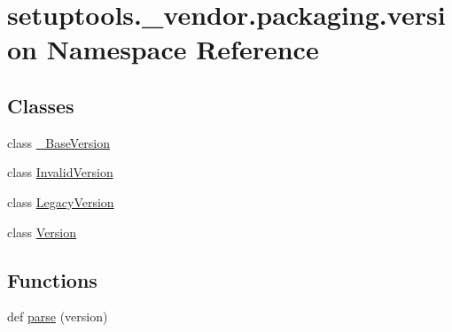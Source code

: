 \hypertarget{namespacesetuptools_1_1__vendor_1_1packaging_1_1version}{}\section{setuptools.\+\_\+vendor.\+packaging.\+version Namespace Reference}
\label{namespacesetuptools_1_1__vendor_1_1packaging_1_1version}
\subsection*{Classes}
\begin{DoxyCompactItemize}
\item 
class \hyperlink{classsetuptools_1_1__vendor_1_1packaging_1_1version_1_1__BaseVersion}{\+\_\+\+Base\+Version}
\item 
class \hyperlink{classsetuptools_1_1__vendor_1_1packaging_1_1version_1_1InvalidVersion}{Invalid\+Version}
\item 
class \hyperlink{classsetuptools_1_1__vendor_1_1packaging_1_1version_1_1LegacyVersion}{Legacy\+Version}
\item 
class \hyperlink{classsetuptools_1_1__vendor_1_1packaging_1_1version_1_1Version}{Version}
\end{DoxyCompactItemize}
\subsection*{Functions}
\begin{DoxyCompactItemize}
\item 
def \hyperlink{namespacesetuptools_1_1__vendor_1_1packaging_1_1version_a25610ec48cdc759b4283c76188365c93}{parse} (version)
\end{DoxyCompactItemize}
